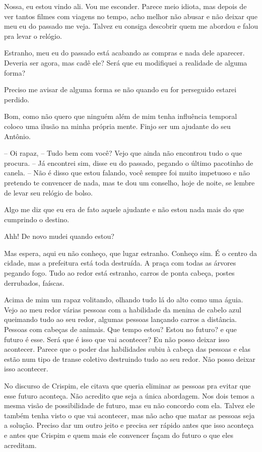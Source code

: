 Nossa, eu estou vindo ali. Vou me esconder. Parece meio idiota, mas depois de ver tantos filmes com viagens no tempo, acho melhor não abusar e não deixar que meu eu do passado me veja. Talvez eu consiga descobrir quem me abordou e falou pra levar o relógio.

Estranho, meu eu do passado está acabando as compras e nada dele aparecer. Deveria ser agora, mas cadê ele? Será que eu modifiquei a realidade de alguma forma?

Preciso me avisar de alguma forma se não quando eu for perseguido estarei perdido.

Bom, como não quero que ninguém além de mim tenha influência temporal coloco uma ilusão na minha própria mente. Finjo ser um ajudante do seu Antônio.

-- Oi rapaz, 
-- Tudo bem com você? Vejo que ainda não encontrou tudo o que procura.
-- Já encontrei sim, disse eu do passado, pegando o último pacotinho de canela.
-- Não é disso que estou falando, você sempre foi muito impetuoso e não pretendo te convencer de nada, mas te dou um conselho, hoje de noite, se lembre de levar seu relógio de bolso.

Algo me diz que eu era de fato aquele ajudante e não estou nada mais do que cumprindo o destino.

Ahh! De novo mudei quando estou?

Mas espera, aqui eu não conheço, que lugar estranho.
Conheço sim. 
É o centro da cidade, mas a prefeitura está toda destruída. A praça com todas as árvores pegando fogo. Tudo ao redor está estranho, carros de ponta cabeça, postes derrubados, faíscas.

Acima de mim um rapaz volitando, olhando tudo lá do alto como uma águia.
Vejo ao meu redor várias pessoas com a habilidade da menina de cabelo azul queimando tudo ao seu redor, algumas pessoas lançando carros a distância. Pessoas com cabeças de animais. 
Que tempo estou? Estou no futuro? e que futuro é esse.
Será que é isso que vai acontecer? Eu não posso deixar isso acontecer. 
Parece que o poder das habilidades subiu à cabeça das pessoas e elas estão num tipo de transe coletivo destruindo tudo ao seu redor. Não posso deixar isso acontecer.

No discurso de Crispim, ele citava que queria eliminar as pessoas pra evitar que esse futuro aconteça. Não acredito que seja a única abordagem. Nos dois temos a mesma visão de possibilidade de futuro, mas eu não concordo com ela. 
Talvez ele também tenha visto o que vai acontecer, mas não acho que matar as pessoas seja a solução. Preciso dar um outro jeito e precisa ser rápido antes que isso aconteça e antes que Crispim e quem mais ele convencer façam do futuro o que eles acreditam.

